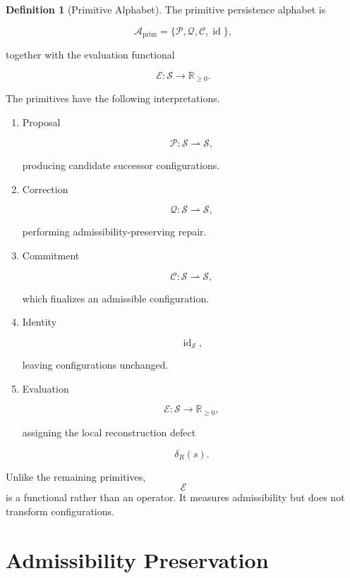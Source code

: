 \documentclass[11pt]{book}
\numberwithin{equation}{chapter}
\theoremstyle{definition}
\newtheorem{definition}{Definition}[chapter]
\theoremstyle{plain}
\begin{document}
\begin{definition}[Primitive Alphabet]

The primitive persistence alphabet is

\[
\mathcal A_{\mathrm{prim}}
=
\{
\mathcal P,
\mathcal Q,
\mathcal C,
\operatorname{id}
\},
\]

together with the evaluation functional

\[
\mathcal E
:
\mathcal S
\rightarrow
\mathbb R_{\ge0}.
\]

The primitives have the following interpretations.

\begin{enumerate}

\item
Proposal

\[
\mathcal P
:
\mathcal S
\rightharpoonup
\mathcal S,
\]

producing candidate successor configurations.

\item
Correction

\[
\mathcal Q
:
\mathcal S
\rightharpoonup
\mathcal S,
\]

performing admissibility-preserving repair.

\item
Commitment

\[
\mathcal C
:
\mathcal S
\rightharpoonup
\mathcal S,
\]

which finalizes an admissible configuration.

\item
Identity

\[
\operatorname{id}_{\mathcal S},
\]

leaving configurations unchanged.

\item
Evaluation

\[
\mathcal E
:
\mathcal S
\rightarrow
\mathbb R_{\ge0},
\]

assigning the local reconstruction defect

\[
\delta_R(s).
\]

\end{enumerate}

\end{definition}

Unlike the remaining primitives,
\[
\mathcal E
\]
is a functional rather than an operator.
It measures admissibility but does not transform configurations.

\section{Admissibility Preservation}
\end{document}
